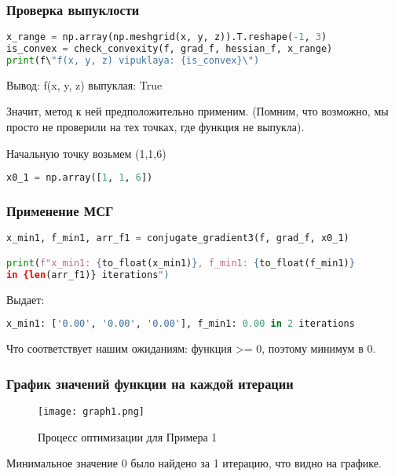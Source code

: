\documentclass{article}
\begin{document}
\subsubsection{Проверка выпуклости}
\begin{lstlisting}[language=Python]
x_range = np.array(np.meshgrid(x, y, z)).T.reshape(-1, 3)
is_convex = check_convexity(f, grad_f, hessian_f, x_range)
print(f\"f(x, y, z) vipuklaya: {is_convex}\")
\end{lstlisting}

Вывод: f(x, y, z) выпуклая: True

Значит, метод к ней предположительно применим. (Помним, что возможно, мы просто не проверили на тех точках, где функция не выпукла).

Начальную точку возьмем (1,1,6)

\begin{lstlisting}[language=Python]
x0_1 = np.array([1, 1, 6])
\end{lstlisting}

\newpage
\subsubsection{Применение МСГ}

\begin{lstlisting}[language=Python]
x_min1, f_min1, arr_f1 = conjugate_gradient3(f, grad_f, x0_1)

print(f"x_min1: {to_float(x_min1)}, f_min1: {to_float(f_min1)}
in {len(arr_f1)} iterations")
\end{lstlisting}

Выдает:

\begin{lstlisting}[language=Python]
x_min1: ['0.00', '0.00', '0.00'], f_min1: 0.00 in 2 iterations
\end{lstlisting}

Что соответствует нашим ожиданиям: функция >=  0, поэтому минимум в 0.

\subsubsection{График значений функции на каждой итерации}

\begin{figure}[H]
    \centering
    \texttt{[image: graph1.png]}
    \caption{Процесс оптимизации для Примера 1}
\end{figure}

Минимальное значение 0 было найдено за 1 итерацию, что видно на графике.
\end{document}
